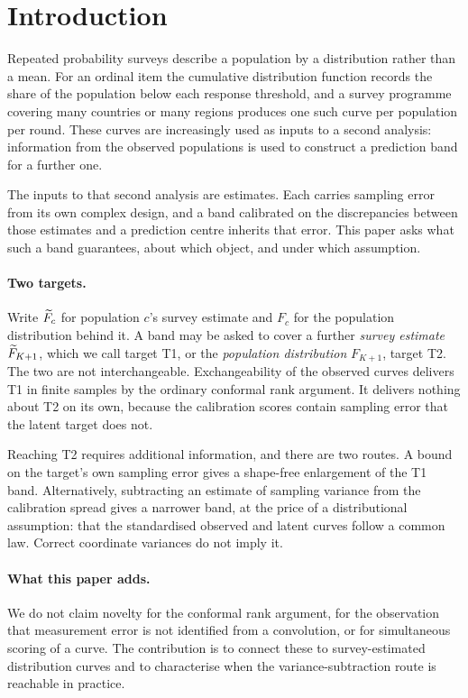 \section{Introduction}

Repeated probability surveys describe a population by a distribution rather
than a mean. For an ordinal item the cumulative distribution function records
the share of the population below each response threshold, and a survey
programme covering many countries or many regions produces one such curve per
population per round. These curves are increasingly used as inputs to a second
analysis: information from the observed populations is used to construct a
prediction band for a further one.

The inputs to that second analysis are estimates. Each carries sampling error
from its own complex design, and a band calibrated on the discrepancies between
those estimates and a prediction centre inherits that error. This paper asks
what such a band guarantees, about which object, and under which assumption.

\paragraph{Two targets.} Write $\widetilde{F}_c$ for population $c$'s survey estimate
and $F_c$ for the population distribution behind it. A band may be asked to
cover a further \emph{survey estimate} $\widetilde{F}_{K+1}$, which we call target
T1, or the \emph{population distribution} $F_{K+1}$, target T2. The two are not
interchangeable. Exchangeability of the observed curves delivers T1 in finite
samples by the ordinary conformal rank argument. It delivers nothing about T2
on its own, because the calibration scores contain sampling error that the
latent target does not.

Reaching T2 requires additional information, and there are two routes. A bound
on the target's own sampling error gives a shape-free enlargement of the T1
band. Alternatively, subtracting an estimate of sampling variance from the
calibration spread gives a narrower band, at the price of a distributional
assumption: that the standardised observed and latent curves follow a common
law. Correct coordinate variances do not imply it.

\paragraph{What this paper adds.} We do not claim novelty for the conformal
rank argument, for the observation that measurement error is not identified
from a convolution, or for simultaneous scoring of a curve. The contribution
is to connect these to survey-estimated distribution curves and to characterise
when the variance-subtraction route is reachable in practice.

